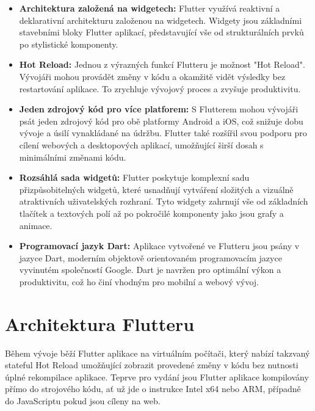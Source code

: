 \begin{itemize}
    \item \textbf{Architektura založená na widgetech:} Flutter využívá reaktivní a deklarativní architekturu založenou na widgetech. Widgety jsou základními stavebními bloky Flutter aplikací, představující vše od strukturálních prvků po stylistické komponenty.

    \item \textbf{Hot Reload:} Jednou z výrazných funkcí Flutteru je možnost "Hot Reload". Vývojáři mohou provádět změny v kódu a okamžitě vidět výsledky bez restartování aplikace. To zrychluje vývojový proces a zvyšuje produktivitu.

    \item \textbf{Jeden zdrojový kód pro více platforem:} S Flutterem mohou vývojáři psát jeden zdrojový kód pro obě platformy Android a iOS, což snižuje dobu vývoje a úsilí vynakládané na údržbu. Flutter také rozšířil svou podporu pro cílení webových a desktopových aplikací, umožňující širší dosah s minimálními změnami kódu.

    \item \textbf{Rozsáhlá sada widgetů:} Flutter poskytuje komplexní sadu přizpůsobitelných widgetů, které usnadňují vytváření složitých a vizuálně atraktivních uživatelských rozhraní. Tyto widgety zahrnují vše od základních tlačítek a textových polí až po pokročilé komponenty jako jsou grafy a animace.

    \item \textbf{Programovací jazyk Dart:} Aplikace vytvořené ve Flutteru jsou psány v jazyce Dart, moderním objektově orientovaném programovacím jazyce vyvinutém společností Google. Dart je navržen pro optimální výkon a produktivitu, což ho činí vhodným pro mobilní a webový vývoj.


\end{itemize}

\section*{Architektura Flutteru} 

Během vývoje běží Flutter aplikace na virtuálním počítači, který nabízí takzvaný stateful Hot Reload umožňující zobrazit provedené změny
v kódu bez nutnosti úplné rekompilace aplikace. Teprve pro vydání jsou Flutter aplikace kompilovány přímo do strojového kódu, 
ať už jde o instrukce Intel x64 nebo ARM, případně do JavaScriptu pokud jsou cíleny na web. \cite{flutterArchOverview}

